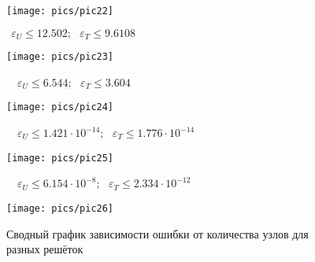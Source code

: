 \begin{figure}[H]
    \centering
    \caption{$~~\varepsilon_U\le12.502;~~~\varepsilon_T\le9.6108$}
    \texttt{[image: pics/pic22]}
    \label{pic:22}
\end{figure}
\begin{figure}[H]
    \centering
    \caption{~~$\varepsilon_U\le6.544;~~~\varepsilon_T\le3.604$}
    \texttt{[image: pics/pic23]}
    \label{pic:23}
\end{figure}
\begin{figure}[H]
    \centering
    \caption{~~$\varepsilon_U\le1.421\cdot10^{-14};~~~\varepsilon_T\le1.776\cdot10^{-14}$}
    \texttt{[image: pics/pic24]}
    \label{pic:24}
\end{figure}
\begin{figure}[H]
    \centering
    \caption{~~$\varepsilon_U\le6.154\cdot10^{-8};~~~\varepsilon_T\le2.334\cdot10^{-12}$}
    \texttt{[image: pics/pic25]}
    \label{pic:25}
\end{figure}
\begin{figure}[H]
    \centering
    \caption{Сводный график зависимости ошибки от количества узлов для разных решёток}
    \texttt{[image: pics/pic26]}
    \label{pic:25}
\end{figure}